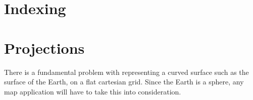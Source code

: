 \documentclass[11pt,a4paper,titlepage,oneside]{report}
\begin{document}
\begin{figure}
\end{figure}

\section{Indexing}
\section{Projections}
There is a fundamental problem with representing a curved surface such as the surface of the Earth, on a flat cartesian grid.
Since the Earth is a sphere, any map application will have to take this into consideration.  
\end{document}

